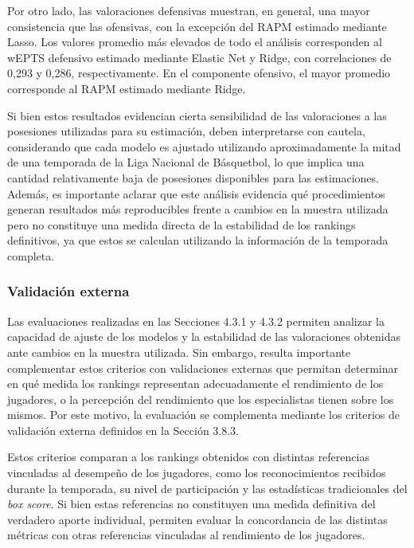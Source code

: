 \documentclass[
  12pt,
]{article}
\begin{document}
Por otro lado, las valoraciones defensivas muestran, en general, una
mayor consistencia que las ofensivas, con la excepción del RAPM estimado
mediante Lasso. Los valores promedio más elevados de todo el análisis
corresponden al wEPTS defensivo estimado mediante Elastic Net y Ridge,
con correlaciones de 0,293 y 0,286, respectivamente. En el componente
ofensivo, el mayor promedio corresponde al RAPM estimado mediante Ridge.

Si bien estos resultados evidencian cierta sensibilidad de las
valoraciones a las posesiones utilizadas para su estimación, deben
interpretarse con cautela, considerando que cada modelo es ajustado
utilizando aproximadamente la mitad de una temporada de la Liga Nacional
de Básquetbol, lo que implica una cantidad relativamente baja de
posesiones disponibles para las estimaciones. Además, es importante
aclarar que este análisis evidencia qué procedimientos generan
resultados más reproducibles frente a cambios en la muestra utilizada
pero no constituye una medida directa de la estabilidad de los rankings
definitivos, ya que estos se calculan utilizando la información de la
temporada completa.

\subsubsection{Validación externa}\label{validaciuxf3n-externa}

Las evaluaciones realizadas en las Secciones 4.3.1 y 4.3.2 permiten
analizar la capacidad de ajuste de los modelos y la estabilidad de las
valoraciones obtenidas ante cambios en la muestra utilizada. Sin
embargo, resulta importante complementar estos criterios con
validaciones externas que permitan determinar en qué medida los rankings
representan adecuadamente el rendimiento de los jugadores, o la
percepción del rendimiento que los especialistas tienen sobre los
mismos. Por este motivo, la evaluación se complementa mediante los
criterios de validación externa definidos en la Sección 3.8.3.

Estos criterios comparan a los rankings obtenidos con distintas
referencias vinculadas al desempeño de los jugadores, como los
reconocimientos recibidos durante la temporada, su nivel de
participación y las estadísticas tradicionales del \emph{box score}. Si
bien estas referencias no constituyen una medida definitiva del
verdadero aporte individual, permiten evaluar la concordancia de las
distintas métricas con otras referencias vinculadas al rendimiento de
los jugadores.
\end{document}
